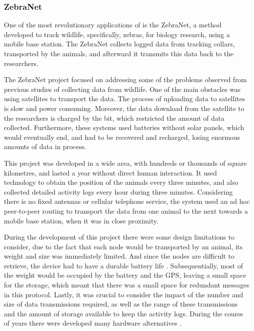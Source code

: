\subsubsection{ZebraNet}
\label{subsubsection:zebranet}
One of the most revolutionary applications of  is the ZebraNet\cite{Juang2002}, a method
developed to track wildlife, specifically, zebras, for biology research, using a mobile base
station. The ZebraNet collects logged data from tracking collars, transported by the
animals, and afterward it transmits this data back to the researchers.

The ZebraNet project focused on addressing some of the problems observed from previous
studies of collecting data from wildlife. One of the main obstacles was using
satellites to transport the data. The process of uploading data to satellites is slow and
power consuming. Moreover, the data download from the satellite to the researchers is
charged by the bit, which restricted the amount of data collected. Furthermore, these
systems used batteries without solar panels, which would eventually end, and had to be
recovered and recharged, losing enormous amounts of data in process.

This project was developed in a wide area, with hundreds or thousands of square kilometres,
and lasted a year without direct human interaction. It used  technology to
obtain the position of the animals every three minutes, and also collected detailed activity
logs every hour during three minutes. Considering there is no fixed antennas or cellular
telephone service, the system used an ad hoc peer-to-peer routing to transport the data from
one animal to the next towards a mobile base station, when it was in close proximity.

During the development of this project there were some design limitations to consider, due to
the fact that each node would be transported by an animal, its weight and size was immediately
limited. And since the nodes are difficult to retrieve, the device had to have a durable
battery life \cite{Zhang2004}. Subsequentially, most of the weight would be occupied by the
battery and the GPS, leaving a small space for the storage, which meant that there was a
small space for redundant messages in this protocol. Lastly, it was crucial to consider the
impact of the number and size of data transmissions required, as well as the range of these
transmissions and the amount of storage available to keep the activity logs.
During the course of years there were developed many hardware alternatives \cite{Zhang2004}.

